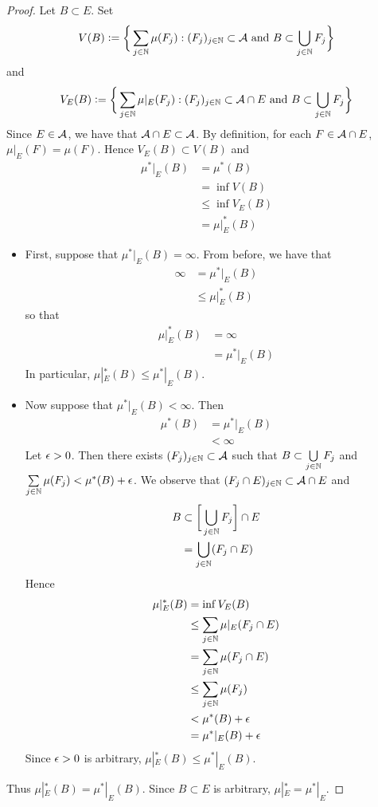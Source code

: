 \documentclass{book}
\begin{document}
	\begin{proof}
		Let $B \subset E$. Set
		$$V(B) \vcentcolon= \bigg \{\sum_{j \in \mathbb{N}} \mu(F_j): (F_j)_{j \in \mathbb{N}} \subset \mathcal{A} \text{ and } B \subset \bigcup\limits_{j \in \mathbb{N}} F_j \bigg \}$$ 
		and 
		$$V_E(B) \vcentcolon= \bigg \{\sum_{j \in \mathbb{N}} \mu|_E(F_j): (F_j)_{j \in \mathbb{N}} \subset \mathcal{A} \cap E \text{ and } B \subset \bigcup\limits_{j \in \mathbb{N}} F_j \bigg \}$$
		Since $E \in \mathcal{A}$, we have that $\mathcal{A} \cap E \subset \mathcal{A}$. By definition, for each $F \in \mathcal{A} \cap E$, $\mu|_E(F) = \mu(F)$. Hence $V_E(B) \subset V(B)$ and
		\begin{align*}
			\mu^*|_E(B)
			& = \mu^*(B) \\
			& = \inf V(B) \\
			& \leq \inf V_E(B) \\
			& = \mu|_E^*(B)
		\end{align*}
		\begin{itemize}
			\item First, suppose that $\mu^*|_E(B) = \infty$. From before, we have that
			\begin{align*}
				\infty
				& = \mu^*|_E(B) \\
				& \leq \mu|_E^*(B) 
			\end{align*}
			so that 
			\begin{align*}
				\mu|_E^*(B)
				& = \infty \\
				& = \mu^*|_E(B)
			\end{align*}
			In particular, $\mu|_E^*(B) \leq \mu^*|_E(B)$.
			\item Now suppose that $\mu^*|_E(B) < \infty$. Then  
			\begin{align*}
				\mu^*(B) 
				& = \mu^*|_E(B) \\
				& < \infty 
			\end{align*}
			Let $\epsilon >0$. Then there exists $(F_j)_{j \in \mathbb{N}} \subset \mathcal{A}$ such that $B \subset \bigcup\limits_{j \in \mathbb{N}} F_j$ and $\sum\limits_{j \in \mathbb{N}} \mu(F_j) < \mu^*(B) + \epsilon$. We observe that $(F_j \cap E)_{j \in \mathbb{N}} \subset \mathcal{A} \cap E$ and 
			\begin{align*}
				B 
				& \subset \bigg[ \bigcup_{j \in \mathbb{N}} F_j \bigg] \cap E \\
				& = \bigcup_{j \in \mathbb{N}} (F_j \cap E) 
			\end{align*}
			Hence
			\begin{align*}
				\mu|_E^*(B)
				& = \inf V_E(B) \\
				& \leq \sum_{j \in \mathbb{N}} \mu|_E(F_j \cap E) \\
				& = \sum_{j \in \mathbb{N}} \mu(F_j \cap E) \\  
				& \leq \sum_{j \in \mathbb{N}} \mu(F_j) \\
				& < \mu^*(B) + \epsilon \\
				& = \mu^*|_E(B) + \epsilon  
			\end{align*}
			Since $\epsilon >0$ is arbitrary, $\mu|_E^*(B) \leq \mu^*|_E(B)$. 
		\end{itemize}
		Thus $\mu|_E^*(B) = \mu^*|_E(B)$. Since $B \subset E$ is arbitrary, $\mu|_E^* = \mu^*|_E$.
	\end{proof}
	
\end{document}
